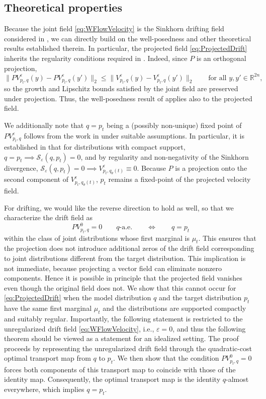 \documentclass[10pt,a4paper]{amsart}
\newcommand{\R}{\mathbb{R}}
\begin{document}
\subsection{Theoretical properties}
\label{sec:CDrift:Theory}
Because the joint field \eqref{eq:WFlowVelocity} is the Sinkhorn
    drifting field considered in \cite{han2026wflow}, we can directly build on
    the well-posedness and other theoretical results established therein.
    In particular, the projected field \eqref{eq:ProjectedDrift} inherits the
    regularity conditions required in 
    \cite{han2026wflow}. Indeed, since $P$ is an orthogonal projection,
    \[
        \|PV_{p_t,q}^{\varepsilon}(y) -PV_{p_t,q}^{\varepsilon}(y')\|_2 \leq \|V_{p_t,q}^{\varepsilon}(y)-V_{p_t,q}^{\varepsilon}(y')\|_2
        \qquad
        \text{for all }y,y'\in\R^{2n},
    \]
    so the growth and Lipschitz bounds satisfied by the joint field are
    preserved under projection. Thus, the well-posedness result of
    \cite{han2026wflow} applies also to the projected field.

We additionally note that $q=p_t$ being a (possibly non-unique) fixed point of $PV_{p_t,q}^{\varepsilon}$ follows from the work in \cite{han2026wflow,pmlr-v89-feydy19a} under suitable assumptions. In particular, it is established in \cite{pmlr-v89-feydy19a} that for distributions with compact support, $q=p_t \implies \mathcal{S}_{\varepsilon}(q,p_t) = 0$, and by regularity and non-negativity of the Sinkhorn divergence, $\mathcal{S}_{\varepsilon}(q,p_t) = 0 \implies V^{\varepsilon}_{p_t,q_{\theta}(t)} \equiv 0$. 
Because $P$ is a projection onto the second component of $V^{\varepsilon}_{p_t,q_{\theta}(t)}$,  $p_t$ remains a fixed-point of the projected velocity field.

For drifting, we would like the reverse direction to hold as well, so that we characterize the drift field as
    \[
       PV_{p_t,q}^{0}=0
    \qquad q\text{-a.e.}
    \qquad\Longleftrightarrow\qquad
    q=p_t
    \]
    within the class of joint distributions whose first marginal is $\mu_t$. This ensures that the projection does not introduce additional zeros of the drift field corresponding to joint distributions different from the target distribution.
This implication is not immediate, because projecting a vector field can eliminate nonzero components. Hence it is possible in principle that the projected field vanishes even though the original field does not. We show that this cannot occur for \eqref{eq:ProjectedDrift} when the model distribution $q$ and the target distribution $p_t$ have the same first marginal $\mu_t$ and the distributions are supported compactly and suitably regular. Importantly, the following statement is restricted to the unregularized drift field \eqref{eq:WFlowVelocity}, i.e., $\varepsilon=0$, and thus the following theorem should be viewed as a statement for an idealized setting. The proof proceeds by representing the unregularized drift field through the quadratic-cost optimal transport map from $q$ to $p_t$. We then show that the condition $PV_{p_t,q}^{0}=0$ forces both components of this transport map to coincide with those of the identity map. Consequently, the optimal transport map is the identity $q$-almost everywhere, which implies $q=p_t$.
\end{document}
